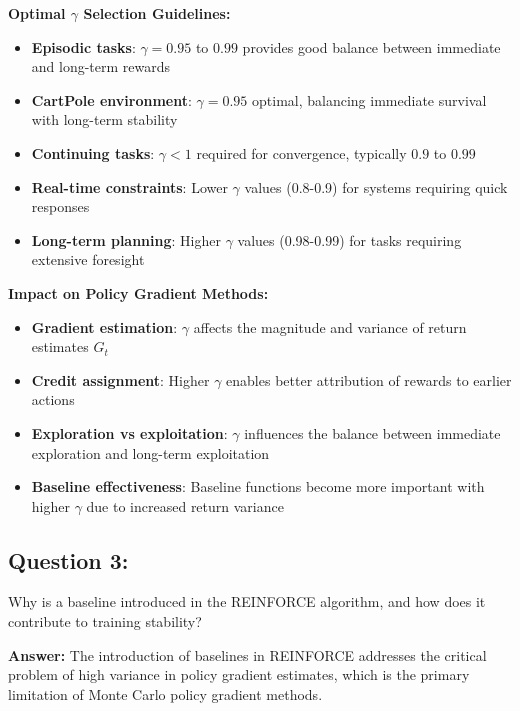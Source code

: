 \documentclass[12pt]{article}
\begin{document}
{{{\textbf{Optimal $\gamma$ Selection Guidelines:}
\begin{itemize}
    \item \textbf{Episodic tasks}: $\gamma = 0.95$ to $0.99$ provides good balance between immediate and long-term rewards
    \item \textbf{CartPole environment}: $\gamma = 0.95$ optimal, balancing immediate survival with long-term stability
    \item \textbf{Continuing tasks}: $\gamma < 1$ required for convergence, typically $0.9$ to $0.99$
    \item \textbf{Real-time constraints}: Lower $\gamma$ values (0.8-0.9) for systems requiring quick responses
    \item \textbf{Long-term planning}: Higher $\gamma$ values (0.98-0.99) for tasks requiring extensive foresight
\end{itemize}

\textbf{Impact on Policy Gradient Methods:}
\begin{itemize}
    \item \textbf{Gradient estimation}: $\gamma$ affects the magnitude and variance of return estimates $G_t$
    \item \textbf{Credit assignment}: Higher $\gamma$ enables better attribution of rewards to earlier actions
    \item \textbf{Exploration vs exploitation}: $\gamma$ influences the balance between immediate exploration and long-term exploitation
    \item \textbf{Baseline effectiveness}: Baseline functions become more important with higher $\gamma$ due to increased return variance
\end{itemize}

\subsection{Question 3:}

Why is a baseline introduced in the REINFORCE algorithm, and how does it contribute to training stability?
\vspace*{0.3cm}

\textbf{Answer:} The introduction of baselines in REINFORCE addresses the critical problem of high variance in policy gradient estimates, which is the primary limitation of Monte Carlo policy gradient methods.

}}}
\end{document}
